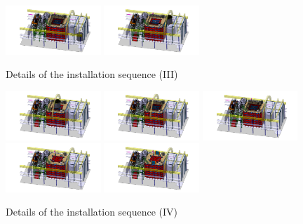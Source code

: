 \begin{figure}[!t]
\includegraphics[width=0.32\textwidth]{./Figures/assembly_sequence_11_07/52.png}
\includegraphics[width=0.32\textwidth]{./Figures/assembly_sequence_11_07/53.png}
\caption{Details of the installation sequence (III) }
\label{fig:Ds20kInstallSequence3}
\end{figure}

\begin{figure}[!t]
\includegraphics[width=0.32\textwidth]{./Figures/assembly_sequence_11_07/54.png}
\includegraphics[width=0.32\textwidth]{./Figures/assembly_sequence_11_07/55.png}
\includegraphics[width=0.32\textwidth]{./Figures/assembly_sequence_11_07/56.png}
\includegraphics[width=0.32\textwidth]{./Figures/assembly_sequence_11_07/57.png}
\includegraphics[width=0.32\textwidth]{./Figures/assembly_sequence_11_07/58.png}
\caption{Details of the installation sequence (IV) }
\label{fig:Ds20kInstallSequence4}
\end{figure}


